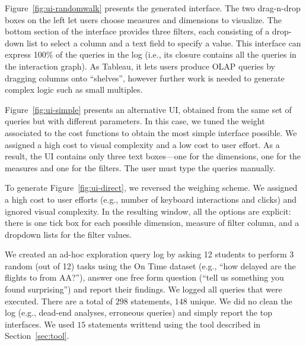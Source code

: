 Figure~\ref{fig:ui-randomwalk} presents the generated interface. The two drag-n-drop boxes on the left let users choose measures and dimensions to visualize. The bottom section of the interface provides three filters, each consisting of a drop-down list to select a column and a text field to specify a value. This interface can express 100\% of the queries in the log (i.e., its closure contains all the queries in the interaction graph). As Tableau, it lets users produce OLAP queries by dragging columns onto ``shelves'', however further work is needed to generate complex logic such as small multiples.

Figure~\ref{fig:ui-simple} presents an alternative UI, obtained from the same set of queries but with different parameters. In this case, we tuned the weight associated to the cost functions to obtain the most simple interface possible. We assigned a high cost to visual complexity and a low cost to user effort. As a result, the UI contains only three text boxes---one for the dimensions, one for the measures and one for the filters. The user must type the queries manually.

To generate Figure~\ref{fig:ui-direct}, we reversed the weighing scheme. We assigned a high cost to user efforts (e.g., number of keyboard interactions and clicks) and ignored visual complexity. In the resulting window, all the options are explicit: there is one tick box for each possible dimension, measure of filter column, and a dropdown lists for the filter values.


 We created an ad-hoc exploration query log by asking 12 students to perform 3 random (out of 12) tasks using the On Time dataset (e.g., ``how delayed are the flights to from AA?''), answer one free form question (``tell us something you found surprising'') and report their findings.   We logged all queries that were executed.  There are a total of $298$ statements, $148$ unique. We did no clean the log (e.g., dead-end analyses, erroneous queries) and simply report the top interfaces.  We used $15$ \lang statements writtend using the tool described in Section~\ref{sec:tool}.

